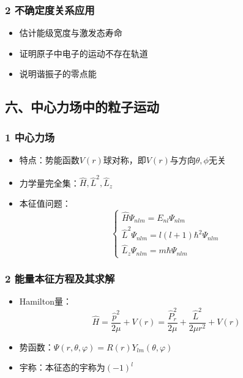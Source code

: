 \documentclass[UTF8,twocolumn]{ctexart}
\providecommand{\tightlist}{%
  \setlength{\itemsep}{0pt}\setlength{\parskip}{0pt}}
\begin{document}
\hypertarget{ux4e0dux786eux5b9aux5ea6ux5173ux7cfbux5e94ux7528}{%
\subsubsection{2
不确定度关系应用}\label{ux4e0dux786eux5b9aux5ea6ux5173ux7cfbux5e94ux7528}}

\begin{itemize}
\tightlist
\item
  估计能级宽度与激发态寿命
\item
  证明原子中电子的运动不存在轨道
\item
  说明谐振子的零点能
\end{itemize}

\hypertarget{ux516dux4e2dux5fc3ux529bux573aux4e2dux7684ux7c92ux5b50ux8fd0ux52a8}{%
\subsection{六、中心力场中的粒子运动}\label{ux516dux4e2dux5fc3ux529bux573aux4e2dux7684ux7c92ux5b50ux8fd0ux52a8}}

\hypertarget{ux4e2dux5fc3ux529bux573a}{%
\subsubsection{1 中心力场}\label{ux4e2dux5fc3ux529bux573a}}

\begin{itemize}
\tightlist
\item
  特点：势能函数\(V(r)\)球对称，即\(V(r)\)与方向\(\theta,\phi\)无关
\item
  力学量完全集：\({\hat{H},\hat{L}^2},\hat{L}_z\)
\item
  本征值问题： \[\begin{cases}
  \hat{H}\Psi_{nlm}=E_{nl}\Psi_{nlm}\\
  \hat{L}^2\Psi_{nlm}=l(l+1)\hbar^2\Psi_{nlm}\\
  \hat{L}_z\Psi_{nlm}=m\hbar\Psi_{nlm}
  \end{cases}\]
\end{itemize}

\hypertarget{ux80fdux91cfux672cux5f81ux65b9ux7a0bux53caux5176ux6c42ux89e3}{%
\subsubsection{2
能量本征方程及其求解}\label{ux80fdux91cfux672cux5f81ux65b9ux7a0bux53caux5176ux6c42ux89e3}}

\begin{itemize}
\tightlist
\item
  Hamilton量：
  \[\hat{H}=\frac{\hat{p}^2}{2\mu}+V(r)=\frac{\hat{P}_r^2}{2\mu}+\frac{\hat{L}^2}{2\mu r^2}+V(r)\]
\item
  势函数：\(\Psi(r,\theta,\varphi)=R(r)Y_{lm}(\theta,\varphi)\)
\item
  宇称：本征态的宇称为\((-1)^l\)
\end{itemize}
\end{document}
